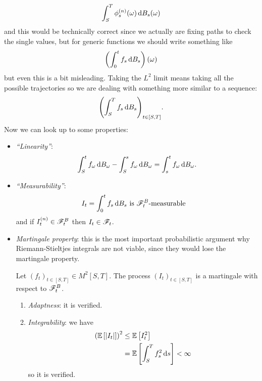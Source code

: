 \documentclass[12pt]{report}
\begin{document}
\begin{equation*}
	\int_{S}^{T}\phi^{(n)}_{s}(\omega)\mathop{}\!\mathrm{d} B_{s}(\omega)
\end{equation*}
and this would be technically correct since we actually are fixing paths to check the single values, but for generic functions we should write something like
\begin{equation*}
	\left(\int_{0}^{t}f_{s}\mathop{}\!\mathrm{d} B_{s}\right)(\omega)
\end{equation*}
but even this is a bit misleading. Taking the $L^{2}$ limit means taking all the possible trajectories so we are dealing with something more similar to a sequence:
\begin{equation*}
	{\left(\int_{S}^{T}f_{s}\mathop{}\!\mathrm{d}B_{s}\right)}_{t\in[S,T]}.
\end{equation*}
Now we can look up to some properties:
\begin{itemize}
	\item \emph{``Linearity''}:
	\begin{equation*}
		\int_{S}^{t}f_{\omega}\mathop{}\!\mathrm{d} B_{\omega}-\int_{S}^{s}f_{\omega}\mathop{}\!\mathrm{d} B_{\omega}=\int_{s}^{t}f_{\omega}\mathop{}\!\mathrm{d} B_{\omega}.
	\end{equation*}
	\item \emph{``Measurability''}:
	\begin{align*}
		I_{t}&=\int_{0}^{t}f_{s}\mathop{}\!\mathrm{d} B_{s}\text{ is $\mathscr{F}^{B}_{t}$-measurable}
	\end{align*}
	and if $I_{t}^{(n)}\in\mathscr{F}^{B}_{t}$ then $I_{t}\in\mathscr{F}_{t}$.
	\item \emph{Martingale property}: this is the most important probabilistic argument why Riemann-Stieltjes integrals are not viable, since they would lose the martingale property.
	\begin{theorem}
		Let ${\left(f_{t}\right)}_{t\in[S,T]}\in M^{2}[S,T]$. The process ${\left(I_{t}\right)}_{t\in[S,T]}$ is a martingale with respect to $\mathscr{F}^{B}_{t}$.
	\end{theorem}
	\begin{fancyproof}
		\begin{enumerate}[\circnum]
			\item \textit{Adaptness}: it is verified. \hfill\faCheckCircle[regular]
			\item \textit{Integrability}: we have
			\begin{align*}
				\left(\mathbb{E}\left[|I_{t}|\right]\right)^{2}&\leq\mathbb{E}\left[I^{2}_{t}\right]\\
				&=\mathbb{E}\left[\int_{S}^{T}f^{2}_{s}\mathop{}\!\mathrm{d} s\right]<\infty
			\end{align*}
			so it is verified.\hfill\faCheckCircle[regular]

\end{enumerate}
\end{fancyproof}
\end{itemize}
\end{document}
